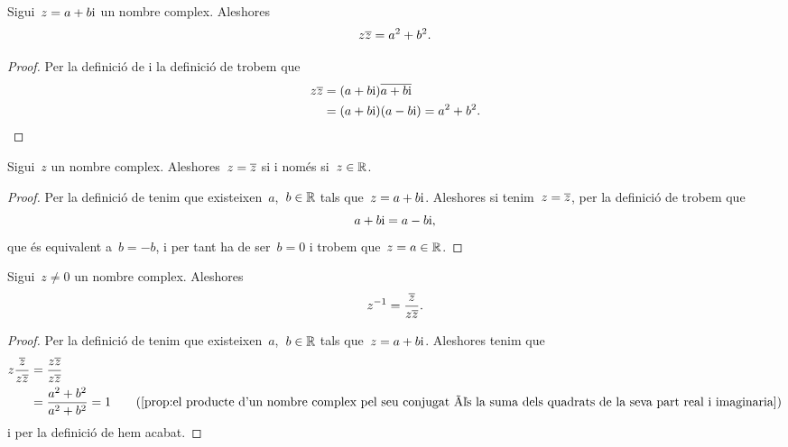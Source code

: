 \documentclass[../../main.tex]{subfiles}
\begin{document}
    \begin{proposition}
        \label{prop:el producte d'un nombre complex pel seu conjugat és la suma dels quadrats de la seva part real i imaginaria}
        Sigui~\(z = a+b\mathrm{i}\) un nombre complex.
        Aleshores
        \[
            z\overline{z} = a^{2}+b^{2}.
        \]
        \begin{proof}
            Per la definició de  i la
            definició de  trobem que
            \begin{align*}
                z\overline{z} &= (a+b\mathrm{i})\overline{a+b\mathrm{i}} \\
                              &= (a+b\mathrm{i})(a-b\mathrm{i}) = a^{2}+b^{2}.\qedhere
            \end{align*}
        \end{proof}
    \end{proposition}
    \begin{proposition}
        \label{prop:un nombre complex és igual al seu conjugat si i només si és un real}
        Sigui~\(z\) un nombre complex.
        Aleshores~\(z = \overline{z}\) si i només si~\(z\in\mathbb{R}\).
        \begin{proof}
            Per la definició de  tenim que
            existeixen~\(a\),~\(b\in\mathbb{R}\) tals que~\(z = a+b\mathrm{i}\).
            Aleshores si tenim~\(z = \overline{z}\), per la definició
            de  trobem que
            \[
                a+b\mathrm{i} = a-b\mathrm{i},
            \]
            que és equivalent a~\(b = -b\), i per tant ha de ser~\(b = 0\) i
            trobem que~\(z = a\in\mathbb{R}\).
        \end{proof}
    \end{proposition}
    \begin{proposition}
        \label{prop:inversa d'un nombre complex en funció del seu conjugat}
        Sigui~\(z \neq 0\) un nombre complex.
        Aleshores
        \[
            z^{-1} = \frac{\overline{z}}{z\overline{z}}.
        \]
        \begin{proof}
            Per la definició de  tenim que
            existeixen~\(a\),~\(b\in\mathbb{R}\) tals que~\(z = a+b\mathrm{i}\).
            Aleshores tenim que
            \begin{align*}
                z\frac{\conjugat{z}}{z\conjugat{z}}
                    &= \frac{z\conjugat{z}}{z\conjugat{z}} \\
                    &= \frac{a^{2}+b^{2}}{a^{2}+b^{2}} = 1
                    \tag{\ref{prop:el producte d'un nombre complex pel seu conjugat és la suma dels quadrats de la seva part real i imaginaria}}
            \end{align*}
            i per la definició de 
            hem acabat.
        \end{proof}
    \end{proposition}
\end{document}

